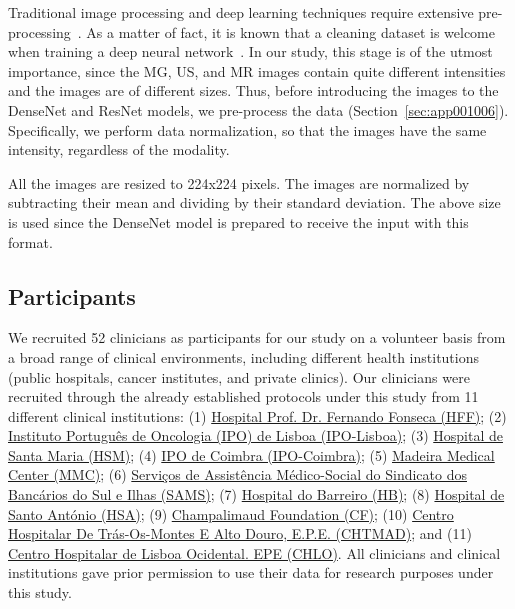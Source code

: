 Traditional image processing and deep learning techniques require extensive pre-processing~\cite{Zhong_2020}.
As a matter of fact, it is known that a cleaning dataset is welcome when training a deep neural network~\cite{RIASATIAN2021102032}.
In our study, this stage is of the utmost importance, since the MG, US, and MR images contain quite different intensities and the images are of different sizes.
Thus, before introducing the images to the DenseNet and ResNet models, we pre-process the data (Section~\ref{sec:app001006}).
Specifically, we perform data normalization, so that the images have the same intensity, regardless of the modality.

All the images are resized to 224x224 pixels.
The images are normalized by subtracting their mean and dividing by their standard deviation.
The above size is used since the DenseNet model is prepared to receive the input with this format.

\subsection{Participants}
\label{sec:chap006005003}

We recruited 52 clinicians as participants for our study on a volunteer basis from a broad range of clinical environments, including different health institutions (public hospitals, cancer institutes, and private clinics).
Our clinicians were recruited through the already established protocols under this study from 11 different clinical institutions: (1) \href{https://hff.min-saude.pt}{Hospital Prof. Dr. Fernando Fonseca (HFF)}; (2) \href{https://www.ipolisboa.min-saude.pt}{Instituto Portugu\^{e}s de Oncologia (IPO) de Lisboa (IPO-Lisboa)}; (3) \href{https://www.chln.min-saude.pt}{Hospital de Santa Maria (HSM)}; (4) \href{http://www.ipocoimbra.min-saude.pt}{IPO de Coimbra (IPO-Coimbra)}; (5) \href{http://www.madeiramedicalcenter.pt}{Madeira Medical Center (MMC)}; (6) \href{https://www.sams.pt}{Serviços de Assist\^{e}ncia M\'{e}dico-Social do Sindicato dos Banc\'{a}rios do Sul e Ilhas (SAMS)}; (7) \href{http://www.chbm.min-saude.pt}{Hospital do Barreiro (HB)}; (8) \href{https://www.chporto.pt}{Hospital de Santo Ant\'{o}nio (HSA)}; (9) \href{https://www.fchampalimaud.org/}{Champalimaud Foundation (CF)}; (10) \href{https://www.chtmad.min-saude.pt/}{Centro Hospitalar De Tr\'{a}s-Os-Montes E Alto Douro, E.P.E. (CHTMAD)}; and (11) \href{https://www.chlo.min-saude.pt/}{Centro Hospitalar de Lisboa Ocidental. EPE (CHLO)}.
All clinicians and clinical institutions gave prior permission to use their data for research purposes under this study.

